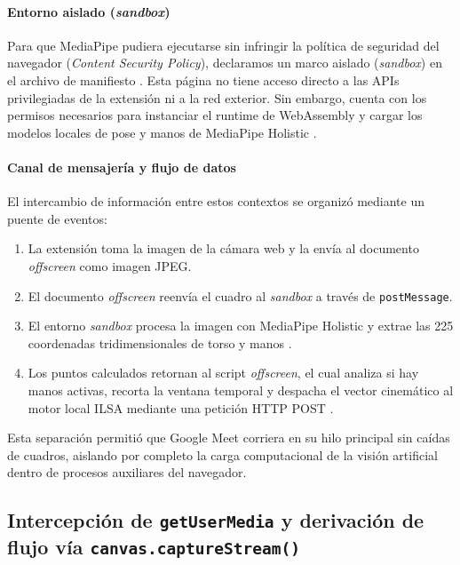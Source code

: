 \paragraph{Entorno aislado (\textit{sandbox})}
Para que MediaPipe pudiera ejecutarse sin infringir la política de seguridad del navegador (\textit{Content Security Policy}), declaramos un marco aislado (\textit{sandbox}) en el archivo de manifiesto \parencite{chrome2024manifestv3}. Esta página no tiene acceso directo a las APIs privilegiadas de la extensión ni a la red exterior. Sin embargo, cuenta con los permisos necesarios para instanciar el runtime de WebAssembly y cargar los modelos locales de pose y manos de MediaPipe Holistic \parencite{google2020mediapipe}.

\paragraph{Canal de mensajería y flujo de datos}
El intercambio de información entre estos contextos se organizó mediante un puente de eventos:
\begin{enumerate}
    \item La extensión toma la imagen de la cámara web y la envía al documento \textit{offscreen} como imagen JPEG.
    \item El documento \textit{offscreen} reenvía el cuadro al \textit{sandbox} a través de \texttt{postMessage}.
    \item El entorno \textit{sandbox} procesa la imagen con MediaPipe Holistic y extrae las 225 coordenadas tridimensionales de torso y manos \parencite{google2020mediapipe}.
    \item Los puntos calculados retornan al script \textit{offscreen}, el cual analiza si hay manos activas, recorta la ventana temporal y despacha el vector cinemático al motor local ILSA mediante una petición HTTP POST \parencite{tiangolo2018fastapi}.
\end{enumerate}

Esta separación permitió que Google Meet corriera en su hilo principal sin caídas de cuadros, aislando por completo la carga computacional de la visión artificial dentro de procesos auxiliares del navegador.

\subsection[Intercepción de Media y canvas.captureStream()]{Intercepción de \texttt{getUserMedia} y derivación de flujo vía \texttt{canvas.captureStream()}}

